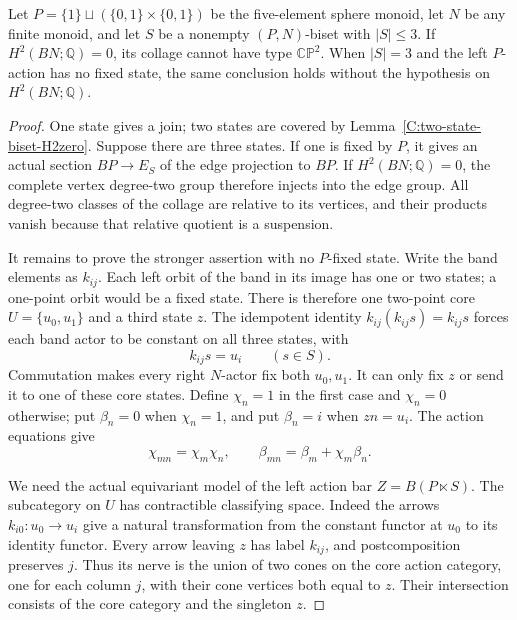 \begin{proposition}
\label{C:P5-three-state-bisets}
Let $P=\{1\}\sqcup(\{0,1\}\times\{0,1\})$ be the
five-element sphere monoid, let $N$ be any finite monoid, and
let $S$ be a nonempty $(P,N)$-biset with $|S|\leq3$.
If $H^2(BN;\mathbb Q)=0$, its collage cannot have type
$\mathbb{CP}^2$.  When $|S|=3$ and the left $P$-action has
no fixed state, the same conclusion holds without the
hypothesis on $H^2(BN;\mathbb Q)$.
\end{proposition}
\begin{proof}
One state gives a join; two states are covered by
Lemma~\ref{C:two-state-biset-H2zero}.  Suppose there are three
states.  If one is fixed by $P$, it gives an actual section
$BP\to E_S$ of the edge projection to $BP$.  If
$H^2(BN;\mathbb Q)=0$, the complete vertex degree-two group
therefore injects into the edge group.  All degree-two classes
of the collage are relative to its vertices, and their products
vanish because that relative quotient is a suspension.

It remains to prove the stronger assertion with no $P$-fixed
state.  Write the band elements as $k_{ij}$.  Each left orbit
of the band in its image has one or two states; a one-point
orbit would be a fixed state.  There is therefore one two-point
core $U=\{u_0,u_1\}$ and a third state $z$.  The idempotent
identity $k_{ij}(k_{ij}s)=k_{ij}s$ forces each band actor to
be constant on all three states, with
\[
 k_{ij}s=u_i\qquad(s\in S).
\]
Commutation makes every right $N$-actor fix both $u_0,u_1$.
It can only fix $z$ or send it to one of these core states.
Define $\chi_n=1$ in the first case and $\chi_n=0$ otherwise;
put $\beta_n=0$ when $\chi_n=1$, and put $\beta_n=i$ when
$zn=u_i$.  The action equations give
\begin{equation}\label{C:P5-three-state-affine}
 \chi_{mn}=\chi_m\chi_n,\qquad
 \beta_{mn}=\beta_m+\chi_m\beta_n.
\end{equation}

We need the actual equivariant model of the left action bar
$Z=B(P\ltimes S)$.  The subcategory on $U$ has contractible
classifying space.  Indeed the arrows $k_{i0}:u_0\to u_i$
give a natural transformation from the constant functor at
$u_0$ to its identity functor.  Every arrow leaving $z$ has
label $k_{ij}$, and postcomposition preserves $j$.  Thus its
nerve is the union of two cones on the core action category,
one for each column $j$, with their cone vertices both equal
to $z$.  Their intersection consists of the core category
and the singleton $z$.


\end{proof}
